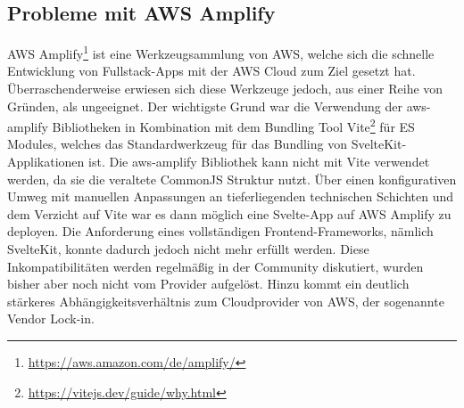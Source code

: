 \subsection{Probleme mit AWS Amplify}
AWS Amplify\footnote{\url{https://aws.amazon.com/de/amplify/}} ist eine Werkzeugsammlung von AWS, welche sich die schnelle Entwicklung von Fullstack-Apps mit der AWS Cloud zum Ziel gesetzt hat. Überraschenderweise erwiesen sich diese Werkzeuge jedoch, aus einer Reihe von Gründen, als ungeeignet. Der wichtigste Grund war die Verwendung der aws-amplify Bibliotheken in Kombination mit dem Bundling Tool Vite\footnote{\url{https://vitejs.dev/guide/why.html}} für ES Modules, welches das Standardwerkzeug für das Bundling von SvelteKit-Applikationen ist. Die aws-amplify Bibliothek kann nicht mit Vite verwendet werden, da sie die veraltete CommonJS Struktur nutzt. Über einen konfigurativen Umweg mit manuellen Anpassungen an tieferliegenden technischen Schichten und dem Verzicht auf Vite war es dann möglich eine Svelte-App auf AWS Amplify zu deployen. Die Anforderung eines vollständigen Frontend-Frameworks, nämlich SvelteKit, konnte dadurch jedoch nicht mehr erfüllt werden. Diese Inkompatibilitäten werden regelmäßig in der Community diskutiert, wurden bisher aber noch nicht vom Provider aufgelöst. Hinzu kommt ein deutlich stärkeres Abhängigkeitsverhältnis zum Cloudprovider von AWS, der sogenannte Vendor Lock-in.
